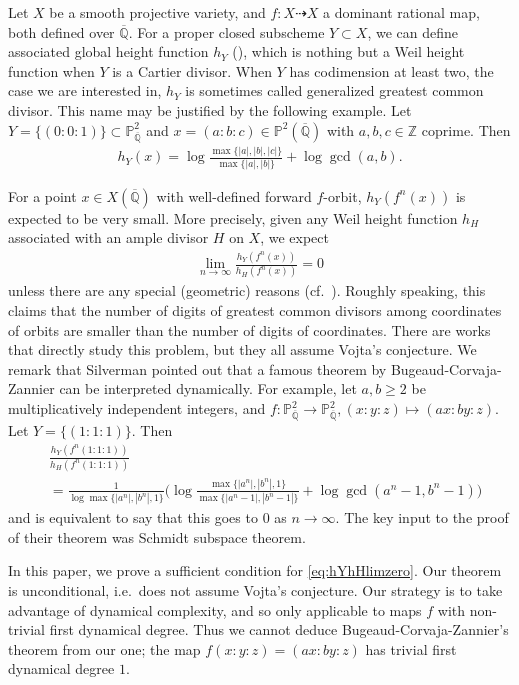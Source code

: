 \documentclass[12pt]{amsart}
\theoremstyle{plain}
\theoremstyle{definition}
\numberwithin{equation}{section}
\def\Z{{\mathbb Z}}
\def\P{{\mathbb P}}
\def\QQ{\overline{\mathbb Q}}
\begin{document}
Let $X$ be a smooth projective variety, 
and $f \colon X \dashrightarrow X$ a dominant rational map, both defined over $\QQ$.
For a proper closed subscheme $Y \subset X$, we can define associated global height function $h_{Y}$ (\cite{Sil87subht}),
which is nothing but a Weil height function when $Y$ is a Cartier divisor.
When $Y$ has codimension at least two, the case we are interested in, 
$h_{Y}$ is sometimes called generalized greatest common divisor.
This name may be justified by the following example.
Let $Y = \{(0:0:1)\} \subset \P^{2}_{\QQ}$ and $x = (a:b:c) \in \P^{2}(\QQ)$
with $a,b,c \in \Z$ coprime. Then
\begin{align}
h_{Y}(x) = \log \frac{\max\{|a|, |b|, |c|\}}{ \max\{|a|, |b|\}} + \log \gcd(a,b).
\end{align}


For a point $x \in X(\QQ)$ with well-defined forward $f$-orbit, 
$h_{Y}(f^{n}(x))$ is expected to be very small.
More precisely, given any Weil height function $h_{H}$ associated with an ample divisor $H$ on $X$,
we expect
\begin{align}
\lim_{n \to \infty} \frac{h_{Y}(f^{n}(x))}{h_{H}(f^{n}(x))} = 0 \label{eq:hYhHlimzero}
\end{align}
unless there are any special (geometric) reasons (cf.\ \cite[section 19]{silverman2024dynamical}).
Roughly speaking, this claims that the number of digits of greatest common divisors 
among coordinates of orbits are smaller than the number of digits of coordinates.
There are works \cite{matsuzawa2020vojta,Hu20} that directly study this problem,
but they all assume Vojta's conjecture.
We remark that Silverman pointed out \cite[Example 35]{silverman2024dynamical} that a famous theorem by Bugeaud-Corvaja-Zannier \cite[Theorem 1]{BCZ03}
can be interpreted dynamically.
For example, let $a,b \geq 2$ be multiplicatively independent integers, and 
$f \colon \P^{2}_{\QQ} \longrightarrow \P^{2}_{\QQ}, (x:y:z) \mapsto (ax:by:z)$.
Let $Y = \{(1:1:1)\}$.
Then 
\begin{align}
&\frac{h_{Y}(f^{n}(1:1:1))}{h_{H}(f^{n}(1:1:1))}\\
&=
\frac{1}{\log \max\{|a^{n}|, |b^{n}|, 1\}} 
\bigg(  
\log \frac{\max\{|a^{n}|, |b^{n}|, 1\}}{\max\{ |a^{n}-1|, |b^{n}-1| \}} 
+
\log \gcd( a^{n}-1, b^{n}-1 )
\bigg)
\end{align}
and \cite[Theorem 1]{BCZ03} is equivalent to say that this goes to $0$ as $n \to \infty$.
The key input to the proof of their theorem was Schmidt subspace theorem.

In this paper, we prove a sufficient condition for \cref{eq:hYhHlimzero}.
Our theorem is unconditional, i.e.\ does not assume Vojta's conjecture.
Our strategy is to take advantage of dynamical complexity, and so only applicable to
maps $f$ with non-trivial first dynamical degree. 
Thus we cannot deduce Bugeaud-Corvaja-Zannier's theorem from our one;
the map $f(x:y:z)=(ax:by:z)$ has trivial first dynamical degree $1$.
\end{document}
